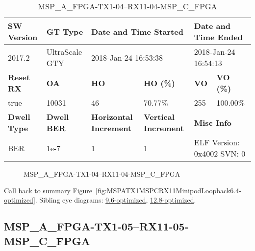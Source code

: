 \begin{table}[h]
\centering
\caption{MSP\_A\_FPGA-TX1-04--RX11-04-MSP\_C\_FPGA}
\label{tab:MSPAFPGATX104RX1104MSPCFPGA6.4-optimized}
\begin{tabular}{@{}|l|l|l|l|l|l|@{}}
\toprule
\textbf{SW Version}                & \textbf{GT Type}   & \multicolumn{2}{l|}{\textbf{Date and Time Started}}            & \multicolumn{2}{l|}{\textbf{Date and Time Ended}}        \\ \midrule
2017.2                       & UltraScale GTY          & \multicolumn{2}{l|}{2018-Jan-24 16:53:38}                   & \multicolumn{2}{l|}{2018-Jan-24 16:54:13}               \\ \midrule
\textbf{Reset RX}                  & \textbf{OA} & \textbf{HO}   & \textbf{HO (\%)} & \textbf{VO} & \textbf{VO (\%)} \\ \midrule
true & 10031        & 46          & 70.77\%        & 255        & 100.00\%       \\ \midrule
\textbf{Dwell Type}                & \textbf{Dwell BER} & \textbf{Horizontal Increment} & \textbf{Vertical Increment}    & \multicolumn{2}{l|}{\textbf{Misc Info}}                  \\ \midrule
BER                            & 1e-7        & 1        & 1           & \multicolumn{2}{l|}{ELF Version: 0x4002 SVN: 0}                         \\ \bottomrule
\end{tabular}
\end{table}

\begin{figure}[h]
\caption{MSP\_A\_FPGA-TX1-04--RX11-04-MSP\_C\_FPGA} \label{fig:MSPAFPGATX104RX1104MSPCFPGA6.4-optimized}
\end{figure}

Call back to summary Figure~\ref{fig:MSPATX1MSPCRX11MinipodLoopback6.4-optimized}.
Sibling eye diagrams: \hyperref[sec:MSPAFPGATX104RX1104MSPCFPGA9.6-optimized]{9.6-optimized}, \hyperref[sec:MSPAFPGATX104RX1104MSPCFPGA12.8-optimized]{12.8-optimized}.

\clearpage
\newpage


\subsection{MSP\_A\_FPGA-TX1-05--RX11-05-MSP\_C\_FPGA}\label{sec:MSPAFPGATX105RX1105MSPCFPGA6.4-optimized}

